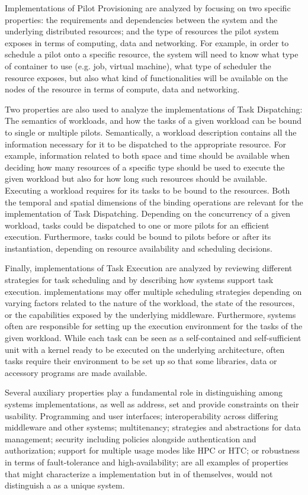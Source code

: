 \documentclass{sig-alternate}
\begin{document}
Implementations of Pilot Provisioning are analyzed by focusing on two specific
properties: the requirements and dependencies between the \pilot system and
the underlying distributed resources; and the type of resources the pilot
system exposes in terms of computing, data and networking. For example, in
order to schedule a pilot onto a specific resource, the \pilot system will
need to know what type of container to use (e.g. job, virtual machine), what
type of scheduler the resource exposes, but also what kind of functionalities
will be available on the nodes of the resource in terms of compute, data and
networking.

Two properties are also used to analyze the implementations of Task
Dispatching: The semantics of workloads, and how the tasks of a given workload
can be bound to single or multiple pilots. Semantically, a workload description
contains all the information necessary for it to be dispatched to the
appropriate resource. For example, information related to both space and time
should be available when deciding how many resources of a specific type should
be used to execute the given workload but also for how long such resources
should be available. Executing a workload requires for its tasks to be bound to
the resources. Both the temporal and spatial dimensions of the binding
operations are relevant for the implementation of Task Dispatching. Depending
on the concurrency of a given workload, tasks could be dispatched to one or
more pilots for an efficient execution. Furthermore, tasks could be bound to
pilots before or after its instantiation, depending on resource availability
and scheduling decisions.

Finally, implementations of Task Execution are analyzed by reviewing different
strategies for task scheduling and by describing how \pilot systems support
task execution. \pilot implementations may offer multiple scheduling
strategies depending on varying factors related to the nature of the workload,
the state of the resources, or the capabilities exposed by the underlying
middleware. Furthermore, \pilot systems often are responsible for setting up
the execution environment for the tasks of the given workload. While each task
can be seen as a self-contained and self-sufficient unit with a kernel ready to
be executed on the underlying architecture, often tasks require their
environment to be set up so that some libraries, data or accessory programs
are made available.

Several auxiliary properties play a fundamental role in distinguishing
among \pilot systems implementations, as well as address, set and
provide constraints on their usability.  Programming and user
interfaces; interoperability across differing middleware and other
\pilot systems; multitenancy; strategies and abstractions for data
management; security including policies alongside authentication and
authorization; support for multiple usage modes like HPC or HTC; or
robustness in terms of fault-tolerance and high-availability; are all
examples of properties that might characterize a \pilot
implementation but in of themselves, would not distinguish a \pilot
as a unique system.
\end{document}

